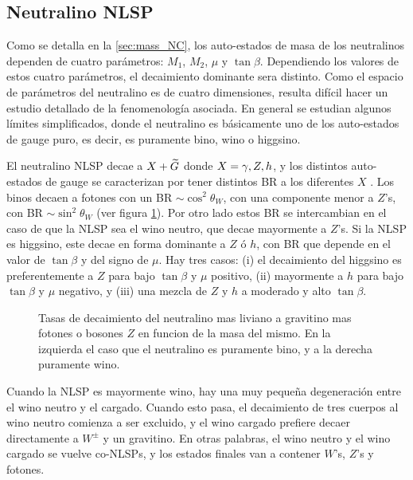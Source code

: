 \subsection{Neutralino NLSP}

Como se detalla en la \cref{sec:mass_NC}, los auto-estados de masa de los
neutralinos dependen de cuatro parámetros: $M_1$, $M_2$, $\mu$ y $\tan\beta$.
Dependiendo los valores de estos cuatro parámetros, el decaimiento dominante
sera distinto. Como el espacio de parámetros del neutralino es de cuatro
dimensiones, resulta difícil hacer un estudio detallado de la fenomenología asociada.
En general se estudian algunos límites simplificados, donde el neutralino
es básicamente uno de los auto-estados de gauge puro, es decir, es puramente
bino, wino o higgsino. %

El neutralino NLSP decae a $X + \widetilde{G}$ donde $X=\gamma,Z,h$, y los distintos
auto-estados de gauge se caracterizan por tener distintos BR a los diferentes $X$
\cite{Ruderman:2011vv}.
Los binos decaen a fotones con un BR $\sim \cos^2\theta_W$, con una componente
menor a $Z$'s, con BR $\sim \sin^2\theta_W$ (ver figura
\cref{fig:bino_wino_br}). Por otro lado estos BR se intercambian en el caso de
que la NLSP sea el wino neutro, que decae mayormente a $Z$'s. Si la NLSP es
higgsino, este decae en forma dominante a $Z$ ó $h$, con BR que depende en el
valor de $\tan\beta$ y del signo de $\mu$. Hay tres casos: (i) el decaimiento
del higgsino es preferentemente a $Z$ para bajo $\tan\beta$ y $\mu$ positivo,
(ii) mayormente a $h$ para bajo $\tan\beta$ y $\mu$ negativo, y (iii) una mezcla
de $Z$ y $h$ a moderado y alto $\tan\beta$.

\begin{figure}[h]
  \centering

  
  

  \caption{Tasas de decaimiento del neutralino mas liviano a gravitino mas fotones o bosones $Z$ en funcion de la masa del mismo. En la izquierda
    el caso que el neutralino es puramente bino, y a la derecha puramente wino.}
  \label{fig:bino_wino_br}
\end{figure}

Cuando la NLSP es mayormente wino, hay una muy pequeña degeneración entre el
wino neutro y el cargado. Cuando esto pasa, el decaimiento de tres cuerpos al
wino neutro comienza a ser excluido, y el wino cargado prefiere decaer
directamente a $W^{\pm}$ y un gravitino. En otras palabras, el wino neutro y el
wino cargado se vuelve co-NLSPs, y los estados finales van a contener $W$'s,
$Z$'s y fotones.

